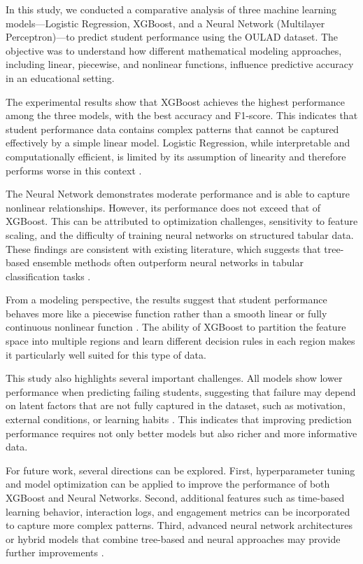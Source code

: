 \documentclass[conference]{IEEEtran}
\begin{document}
In this study, we conducted a comparative analysis of three machine learning models—Logistic Regression, XGBoost, and a Neural Network (Multilayer Perceptron)—to predict student performance using the OULAD dataset. The objective was to understand how different mathematical modeling approaches, including linear, piecewise, and nonlinear functions, influence predictive accuracy in an educational setting.

The experimental results show that XGBoost achieves the highest performance among the three models, with the best accuracy and F1-score. This indicates that student performance data contains complex patterns that cannot be captured effectively by a simple linear model. Logistic Regression, while interpretable and computationally efficient, is limited by its assumption of linearity and therefore performs worse in this context \cite{sitompul2025}.

The Neural Network demonstrates moderate performance and is able to capture nonlinear relationships. However, its performance does not exceed that of XGBoost. This can be attributed to optimization challenges, sensitivity to feature scaling, and the difficulty of training neural networks on structured tabular data. These findings are consistent with existing literature, which suggests that tree-based ensemble methods often outperform neural networks in tabular classification tasks \cite{chong2025, sitompul2025}.

From a modeling perspective, the results suggest that student performance behaves more like a piecewise function rather than a smooth linear or fully continuous nonlinear function \cite{ki2026}. The ability of XGBoost to partition the feature space into multiple regions and learn different decision rules in each region makes it particularly well suited for this type of data.

This study also highlights several important challenges. All models show lower performance when predicting failing students, suggesting that failure may depend on latent factors that are not fully captured in the dataset, such as motivation, external conditions, or learning habits \cite{nayak2023, chen2015}. This indicates that improving prediction performance requires not only better models but also richer and more informative data.

For future work, several directions can be explored. First, hyperparameter tuning and model optimization can be applied to improve the performance of both XGBoost and Neural Networks. Second, additional features such as time-based learning behavior, interaction logs, and engagement metrics can be incorporated to capture more complex patterns. Third, advanced neural network architectures or hybrid models that combine tree-based and neural approaches may provide further improvements \cite{chukwuemeka2026}.
\end{document}
